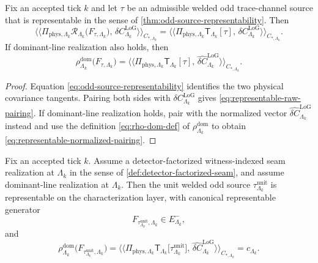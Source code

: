 \documentclass[11pt]{article}
\begin{document}
\begin{proposition}
\label{prop:odd-source-pairing}
Fix an accepted tick \(k\) and let \(\tau\) be an admissible welded odd trace-channel source that is
representable in the sense of \cref{thm:odd-source-representability}.
Then
\begin{equation}
\big\langle\!\big\langle
\Pi_{\mathrm{phys},\Lambda_k}\mathcal R_{\Lambda_k}\!\big(F_{\tau,\Lambda_k}\big),\,
\delta C^{\mathrm{LoG}}_{\Lambda_k}
\big\rangle\!\big\rangle_{C_{\ast,\Lambda_k}}
=
\big\langle\!\big\langle
\Pi_{\mathrm{phys},\Lambda_k}\mathsf T_{\Lambda_k}[\tau],\,
\delta C^{\mathrm{LoG}}_{\Lambda_k}
\big\rangle\!\big\rangle_{C_{\ast,\Lambda_k}}.
\label{eq:representable-raw-pairing}
\end{equation}
If dominant-line realization also holds, then
\begin{equation}
\rho^{\mathrm{dom}}_{\Lambda_k}\!\big(F_{\tau,\Lambda_k}\big)
=
\big\langle\!\big\langle
\Pi_{\mathrm{phys},\Lambda_k}\mathsf T_{\Lambda_k}[\tau],\,
\widehat{\delta C}^{\mathrm{LoG}}_{\Lambda_k}
\big\rangle\!\big\rangle_{C_{\ast,\Lambda_k}}.
\label{eq:representable-normalized-pairing}
\end{equation}
\end{proposition}

\begin{proof}
Equation \eqref{eq:odd-source-representability} identifies the two physical covariance tangents.
Pairing both sides with \(\delta C^{\mathrm{LoG}}_{\Lambda_k}\) gives
\eqref{eq:representable-raw-pairing}.
If dominant-line realization holds, pair with the normalized vector
\(
\widehat{\delta C}^{\mathrm{LoG}}_{\Lambda_k}
\)
instead and use the definition \eqref{eq:rho-dom-def} of
\(
\rho^{\mathrm{dom}}_{\Lambda_k}
\)
to obtain \eqref{eq:representable-normalized-pairing}.
\end{proof}

\begin{corollary}
\label{cor:unit-source-representability}
Fix an accepted tick \(k\).
Assume a detector-factorized witness-indexed seam realization at \(\Lambda_k\) in the sense of
\cref{def:detector-factorized-seam}, and assume dominant-line realization at \(\Lambda_k\).
Then the unit welded odd source
\(
\tau^{\mathrm{unit}}_{\Lambda_k}
\)
is representable on the characterization layer, with canonical representable generator
\[
F_{\tau^{\mathrm{unit}}_{\Lambda_k},\Lambda_k}\in E^-_{\Lambda_k},
\]
and
\begin{equation}
\rho^{\mathrm{dom}}_{\Lambda_k}
\!\bigl(
F_{\tau^{\mathrm{unit}}_{\Lambda_k},\Lambda_k}
\bigr)
=
\big\langle\!\big\langle
\Pi_{\mathrm{phys},\Lambda_k}\mathsf T_{\Lambda_k}\!\big[\tau^{\mathrm{unit}}_{\Lambda_k}\big],\,
\widehat{\delta C}^{\mathrm{LoG}}_{\Lambda_k}
\big\rangle\!\big\rangle_{C_{\ast,\Lambda_k}}
=
c_{\Lambda_k}.
\label{eq:unit-source-representability-scalar}
\end{equation}
\end{corollary}
\end{document}
